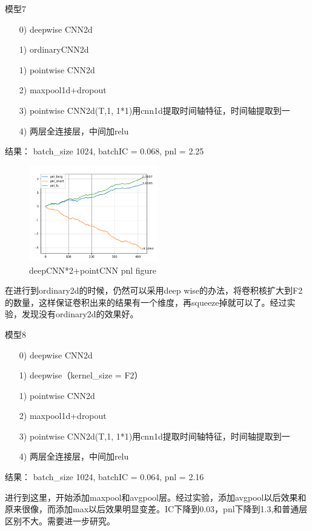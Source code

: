\documentclass[11pt]{ctexart}
\begin{document}
模型7 
\begin{itemize}
  \item [0)]
  deepwise CNN2d
  \item [1)]
  ordinaryCNN2d
  \item [1)]
  pointwise CNN2d
  \item [2)]
  maxpool1d+dropout
  \item [3)]
  pointwise CNN2d(T,1, 1*1)用cnn1d提取时间轴特征，时间轴提取到一
  \item [4)]
  两层全连接层，中间加relu
\end{itemize}
结果： batch\_size 1024, batchIC = 0.068, pnl = 2.25
\begin{figure}[!ht]
\begin{center}
\includegraphics[width=0.5\textwidth]{ws.PNG}
\end{center}
\caption{deepCNN*2+pointCNN pnl figure}
\label{FIG.5}
\end{figure}

在进行到ordinary2d的时候，仍然可以采用deep wise的办法，将卷积核扩大到F2的数量，这样保证卷积出来的结果有一个维度，再squeeze掉就可以了。经过实验，发现没有ordinary2d的效果好。

模型8
\begin{itemize}
  \item [0)]
  deepwise CNN2d
  \item [1)]
  deepwise（kernel\_size = F2）
  \item [1)]
  pointwise CNN2d
  \item [2)]
  maxpool1d+dropout
  \item [3)]
  pointwise CNN2d(T,1, 1*1)用cnn1d提取时间轴特征，时间轴提取到一
  \item [4)]
  两层全连接层，中间加relu
\end{itemize}
结果： batch\_size 1024, batchIC = 0.064, pnl = 2.16

进行到这里，开始添加maxpool和avgpool层。经过实验，添加avgpool以后效果和原来很像，而添加max以后效果明显变差。IC下降到0.03，pnl下降到1.3,和普通层区别不大。需要进一步研究。
\end{document}

